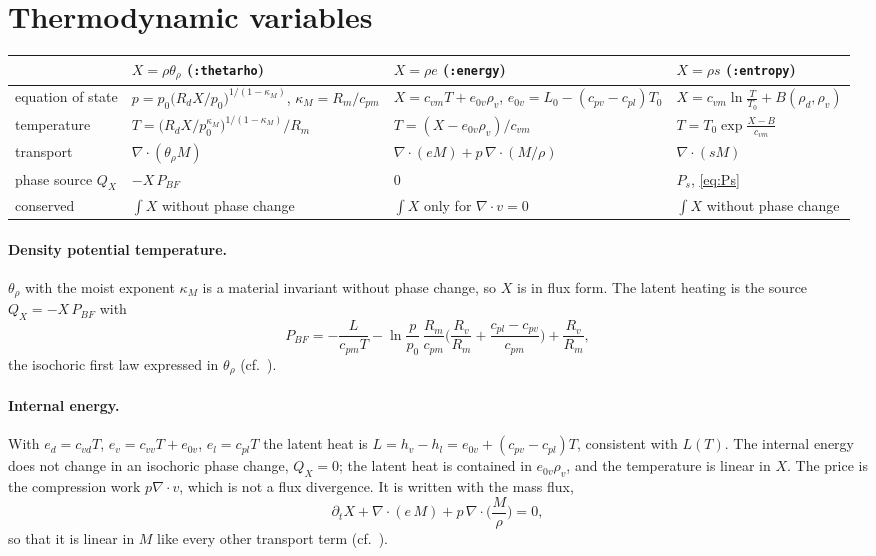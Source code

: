 \documentclass[11pt,a4paper]{article}
\newcommand{\code}[1]{\texttt{\small #1}}
\begin{document}
\section{Thermodynamic variables}\label{sec:thvar}
\begin{center}\small
\begin{tabular}{p{1.9cm}p{4.6cm}p{4.0cm}p{4.4cm}}\toprule
& $X=\rho\theta_\rho$ (\code{:thetarho}) & $X=\rho e$ (\code{:energy}) & $X=\rho s$ (\code{:entropy})\\\midrule
equation of state & $p=p_0\big(R_dX/p_0\big)^{1/(1-\kappa_M)}$, $\kappa_M=R_m/c_{pm}$ &
$X=c_{vm}T+e_{0v}\rho_v$, $e_{0v}=L_0-(c_{pv}-c_{pl})T_0$ & $X=c_{vm}\ln\frac T{T_0}+B(\rho_d,\rho_v)$\\
temperature & $T=\big(R_dX/p_0^{\kappa_M}\big)^{1/(1-\kappa_M)}/R_m$ & $T=(X-e_{0v}\rho_v)/c_{vm}$ & $T=T_0\exp\frac{X-B}{c_{vm}}$\\
transport & $\nabla\cdot(\theta_\rho M)$ & $\nabla\cdot(eM)+p\,\nabla\cdot(M/\rho)$ & $\nabla\cdot(sM)$\\
phase source $Q_X$ & $-X\,P_{BF}$ & $0$ & $P_s$, \eqref{eq:Ps}\\
conserved & $\int X$ without phase change & $\int X$ only for $\nabla\cdot v=0$ & $\int X$ without phase change\\\bottomrule
\end{tabular}
\end{center}
\paragraph{Density potential temperature.} $\theta_\rho$ with the moist exponent $\kappa_M$ is a
material invariant without phase change, so $X$ is in flux form. The latent heating is the source
$Q_X=-X\,P_{BF}$ with
\[
P_{BF}=-\frac L{c_{pm}T}-\ln\frac p{p_0}\,\frac{R_m}{c_{pm}}\Big(\frac{R_v}{R_m}+\frac{c_{pl}-c_{pv}}{c_{pm}}\Big)+\frac{R_v}{R_m},
\]
the isochoric first law expressed in $\theta_\rho$ (cf.\ \cite{bryanfritsch}).

\paragraph{Internal energy.} With $e_d=c_{vd}T$, $e_v=c_{vv}T+e_{0v}$, $e_l=c_{pl}T$ the latent heat is
$L=h_v-h_l=e_{0v}+(c_{pv}-c_{pl})T$, consistent with $L(T)$. The internal energy does not change in an
isochoric phase change, $Q_X=0$; the latent heat is contained in $e_{0v}\rho_v$, and the temperature is
linear in $X$. The price is the compression work $p\nabla\cdot v$, which is not a flux divergence. It is
written with the mass flux,
\[
\partial_tX+\nabla\cdot(e\,M)+p\,\nabla\cdot\Big(\frac M\rho\Big)=0,
\]
so that it is linear in $M$ like every other transport term (cf.\ \cite{satoh}).
\end{document}
